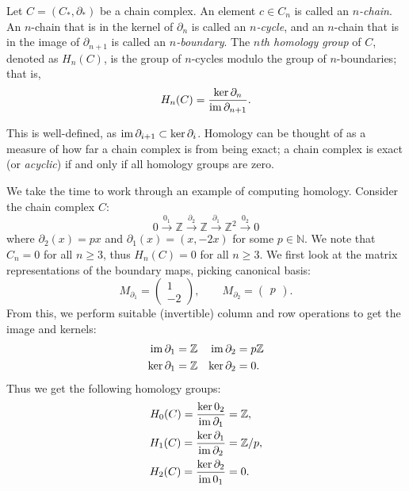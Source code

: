 \begin{definition}[Homology]
    Let $C = (C_*, \partial_*)$ be a chain complex. An element $c \in C_n$ is called an \emph{$n$-chain}. An $n$-chain that is in the kernel of $\partial_n$ is called an \emph{$n$-cycle}, and an $n$-chain that is in the image of $\partial_{n+1}$ is called an \emph{$n$-boundary}. The \emph{$n$th homology group} of $C$, denoted as $H_n(C)$, is the group of $n$-cycles modulo the group of $n$-boundaries; that is,
    \[ H_n(C) = \frac{\ker{\partial_n}}{\operatorname{im}{\partial_{n+1}}}. \]
\end{definition}

This is well-defined, as $\operatorname{im}\partial_{i+1} \subset \ker\partial_i$. Homology can be thought of as a measure of how far a chain complex is from being exact; a chain complex is exact (or \emph{acyclic}) if and only if all homology groups are zero.

\begin{example}
    We take the time to work through an example of computing homology. Consider the chain complex $C$:
    \[ 0 \xrightarrow{0_1} \mathbb Z \xrightarrow{\partial_2} \mathbb Z \xrightarrow{\partial_1} \mathbb Z^2 \xrightarrow{0_2} 0 \]
    where $\partial_2(x) = px$ and $\partial_1(x) = (x, -2x)$ for some $p \in \mathbb N$. We note that $C_n = 0$ for all $n \geq 3$, thus $H_n(C) = 0$ for all $n \geq 3$. We first look at the matrix representations of the boundary maps, picking canonical basis:
    \[
        M_{\partial_1} = \begin{pmatrix}
            1 \\ - 2
        \end{pmatrix}, \qquad
        M_{\partial_2} = \begin{pmatrix}
            p
        \end{pmatrix}.
    \]
    From this, we perform suitable (invertible) column and row operations to get the image and kernels:
    \begin{align*}
        \operatorname{im}\partial_1  & = \mathbb Z & \operatorname{im}\partial_2  & = p\mathbb Z \\
        \ker\partial_1 & = \mathbb Z & \ker\partial_2 & = 0.
    \end{align*}
    Thus we get the following homology groups:
    \begin{align*}
        H_0(C) = \frac{\ker 0_2}{\operatorname{im}\partial_1}       & = \mathbb Z,   \\
        H_1(C) = \frac{\ker\partial_1}{\operatorname{im}\partial_2} & = \mathbb Z/p, \\
        H_2(C) = \frac{\ker\partial_2}{\operatorname{im} 0_1}       & = 0.
    \end{align*}
\end{example}

